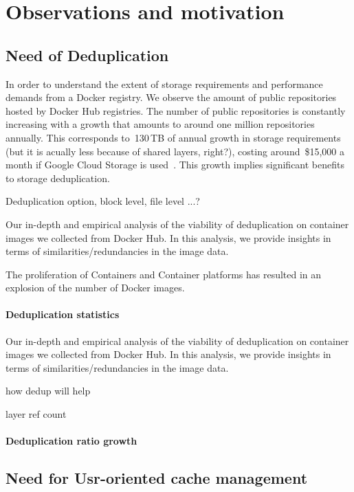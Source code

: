 \section{Observations and motivation} %
\label{sec:background}

\subsection{Need of Deduplication}

In order to understand the extent of storage requirements and performance demands from a Docker registry. 
We observe the amount of public repositories hosted by Docker Hub registries. 
The number of public repositories is constantly increasing with a growth that amounts 
to around one million repositories annually. 
This corresponds to~130\,TB of annual growth in storage requirements (but it is acually less because of shared layers, right?), 
costing around~\$15,000 a month if Google Cloud Storage is used~\cite{GoogleCloudStoragePricing}.
This growth implies significant benefits to storage deduplication. 

Deduplication option, block level, file level ...?

Our in-depth and empirical analysis of the viability of deduplication on container images we collected from Docker Hub. In this analysis, we provide insights in terms of similarities/redundancies in the image data. 

The proliferation of Containers and Container platforms has resulted in an explosion of the number of Docker images.


\paragraph{Deduplication statistics} %

Our in-depth and empirical analysis of the viability of deduplication on container images we collected from Docker Hub. In this analysis, we provide insights in terms of similarities/redundancies in the image data. 

how dedup will help


layer ref count 

\paragraph{Deduplication ratio growth} %

\subsection{Need for Usr-oriented cache management}


